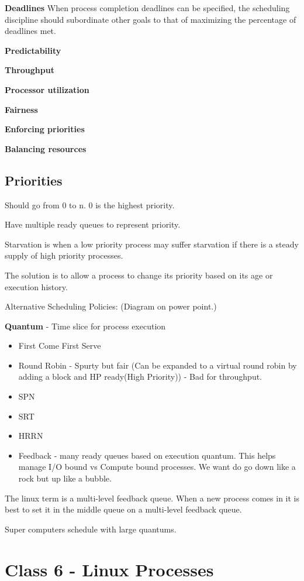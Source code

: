 \documentclass{article}
\begin{document}
{\bf Deadlines} When process completion deadlines can be specified, the scheduling discipline should subordinate other goals to that of maximizing the percentage of deadlines met.

{\bf Predictability} 

{\bf Throughput} 

{\bf Processor utilization}

{\bf Fairness}

{\bf Enforcing priorities} 

{\bf Balancing resources}

\subsection{Priorities}

Should go from 0 to n. 0 is the highest priority.

Have multiple ready queues to represent priority. 

Starvation is when a low priority process may suffer starvation if there is a steady supply of high priority processes.

The solution is to allow a process to change its priority based on its age or execution history. 

Alternative Scheduling Policies: (Diagram on power point.)

{\bf Quantum} - Time slice for process execution

\begin{itemize}
\item First Come First Serve
\item Round Robin - Spurty but fair (Can be expanded to a virtual round robin by adding a block and HP ready(High Priority)) - Bad for throughput.
\item SPN
\item SRT
\item HRRN
\item Feedback - many ready queues based on execution quantum. This helps manage I/O bound vs Compute bound processes. 
We want do go down like a rock but up like a bubble.
\end{itemize}

The linux term is a multi-level feedback queue. 
When a new process comes in it is best to set it in the middle queue on a multi-level feedback queue. 

Super computers schedule with large quantums. 

\section{Class 6 - Linux Processes}
\end{document}
